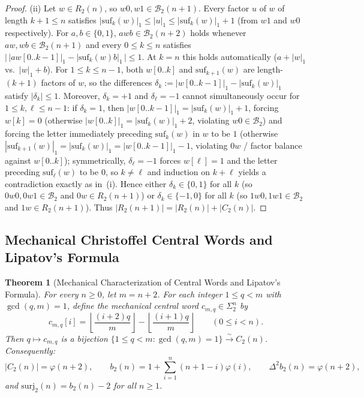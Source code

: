 \documentclass[11pt,a4paper]{article}
\newtheorem{theorem}{Theorem}[section]
\theoremstyle{definition}
\newcommand{\surj}{\mathrm{surj}}
\begin{document}
\begin{proof}
(ii) Let $w \in R_2(n)$, so $w0, w1 \in \mathcal{B}_2(n+1)$. Every factor $u$ of $w$ of length $k + 1 \le n$ satisfies $|\mathrm{suf}_k(w)|_1 \le |u|_1 \le |\mathrm{suf}_k(w)|_1 + 1$ (from $w1$ and $w0$ respectively). For $a, b \in \{0, 1\}$, $awb \in \mathcal{B}_2(n+2)$ holds whenever $aw, wb \in \mathcal{B}_2(n+1)$ and every $0 \le k \le n$ satisfies $\bigl|\,|aw[0..k-1]|_1 - |\mathrm{suf}_k(w)b|_1\,\bigr| \le 1$. At $k = n$ this holds automatically ($a + |w|_1$ vs.\ $|w|_1 + b$). For $1 \le k \le n - 1$, both $w[0..k]$ and $\mathrm{suf}_{k+1}(w)$ are length-$(k+1)$ factors of $w$, so the differences $\delta_k := |w[0..k-1]|_1 - |\mathrm{suf}_k(w)|_1$ satisfy $|\delta_k| \le 1$. Moreover, $\delta_k = +1$ and $\delta_\ell = -1$ cannot simultaneously occur for $1 \le k, \ell \le n - 1$: if $\delta_k = 1$, then $|w[0..k-1]|_1 = |\mathrm{suf}_k(w)|_1 + 1$, forcing $w[k] = 0$ (otherwise $|w[0..k]|_1 = |\mathrm{suf}_k(w)|_1 + 2$, violating $w0 \in \mathcal{B}_2$) and forcing the letter immediately preceding $\mathrm{suf}_k(w)$ in $w$ to be $1$ (otherwise $|\mathrm{suf}_{k+1}(w)|_1 = |\mathrm{suf}_k(w)|_1 = |w[0..k-1]|_1 - 1$, violating $0w$ / factor balance against $w[0..k]$); symmetrically, $\delta_\ell = -1$ forces $w[\ell] = 1$ and the letter preceding $\mathrm{suf}_\ell(w)$ to be $0$, so $k \neq \ell$ and induction on $k + \ell$ yields a contradiction exactly as in~(i). Hence either $\delta_k \in \{0, 1\}$ for all $k$ (so $0w0, 0w1 \in \mathcal{B}_2$ and $0w \in R_2(n+1)$) or $\delta_k \in \{-1, 0\}$ for all $k$ (so $1w0, 1w1 \in \mathcal{B}_2$ and $1w \in R_2(n+1)$). Thus $|R_2(n+1)| = |R_2(n)| + |C_2(n)|$.
\end{proof}

\subsection{Mechanical Christoffel Central Words and Lipatov's Formula}

\begin{theorem}[Mechanical Characterization of Central Words and Lipatov's Formula]
\label{thm:lipatov}
For every $n \ge 0$, let $m = n + 2$. For each integer $1 \le q < m$ with $\gcd(q, m) = 1$, define the mechanical central word $c_{m,q} \in \Sigma_2^n$ by
\[
  c_{m,q}[i] = \left\lfloor \frac{(i + 2)q}{m} \right\rfloor - \left\lfloor \frac{(i + 1)q}{m} \right\rfloor \qquad (0 \le i < n).
\]
Then $q \mapsto c_{m,q}$ is a bijection $\{1 \le q < m : \gcd(q, m) = 1\} \xrightarrow{\sim} C_2(n)$. Consequently:
\[
  |C_2(n)| = \varphi(n + 2), \qquad
  b_2(n) = 1 + \sum_{i=1}^{n} (n + 1 - i)\varphi(i), \qquad
  \Delta^2 b_2(n) = \varphi(n + 2),
\]
and $\surj_2(n) = b_2(n) - 2$ for all $n \ge 1$.
\end{theorem}
\end{document}
